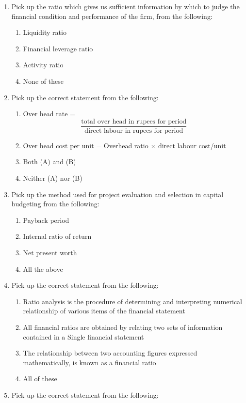 \documentclass[11pt,a4paper]{article}
\begin{document}
\begin{enumerate}
\begin{enumerate}[label=\Alph*.]
\end{enumerate}
\item{Pick up the ratio which gives us sufficient information by which to judge the financial condition and performance of the firm, from the following:}
\begin{enumerate}[label=\Alph*.]
\item{Liquidity ratio}
\item{Financial leverage ratio}
\item{Activity ratio}
\item{None of these}
\end{enumerate}
\item{Pick up the correct statement from the following:}
\begin{enumerate}[label=\Alph*.]
\item{Over head rate = $$\frac{{{\text{total over head in rupees for period}}}}{{{\text{direct labour in rupees for period}}}}$$}
\item{Over head cost per unit = Overhead ratio $\times$ direct labour cost/unit}
\item{Both (A) and (B)}
\item{Neither (A) nor (B)}
\end{enumerate}
\item{Pick up the method used for project evaluation and selection in capital budgeting from the following:}
\begin{enumerate}[label=\Alph*.]
\item{Payback period}
\item{Internal ratio of return}
\item{Net present worth}
\item{All the above}
\end{enumerate}
\item{Pick up the correct statement from the following:}
\begin{enumerate}[label=\Alph*.]
\item{Ratio analysis is the procedure of determining and interpreting numerical relationship of various items of the financial statement}
\item{All financial ratios are obtained by relating two sets of information contained in a Single financial statement}
\item{The relationship between two accounting figures expressed mathematically, is known as a financial ratio}
\item{All of these}
\end{enumerate}
\item{Pick up the correct statement from the following:}

\end{enumerate}
\end{document}
